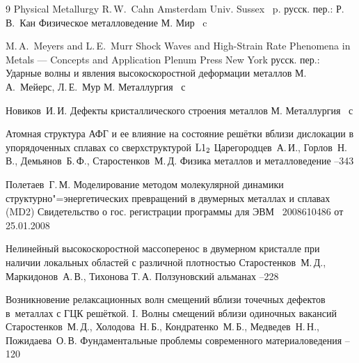 \begin{thebibliography}{9}
\book Physical Metallurgy 
\ed R.\,W.~Cahn
\publaddr Amsterdam
\publ Univ. Sussex
~p.
\rtransl
русск. пер.:
\ed Р.\,В.~Кан  
\book Физическое металловедение 
\publaddr  М.
\publ Мир
~c

\ed M.\,A.~Meyers and L.\,E.~Murr  
\book Shock Waves and High-Strain Rate Phenomena in Metals --- Concepts and Application
\publ Plenum Press
\publaddr New York
\rtransl
русск. пер.:
\book Ударные волны и явления высокоскоростной деформации металлов 
\ed М.\,А.~Мейерс, Л.\,Е.~Мур
\publaddr М.
\publ Металлургия
~с

\by Новиков~И.\,И. 
\book Дефекты кристаллического строения металлов 
\publaddr М.
\publ Металлургия
~с

\paper Атомная структура АФГ и ее влияние на состояние решётки вблизи дислокации в упорядоченных сплавах со сверхструктурой $\rm L1_{2}$
\by Царегородцев~А.\,И., Горлов~Н.\,В., Демьянов~Б.\,Ф., Старостенков~М.\,Д. 
\jour Физика металлов и металловедение
--343

\by Полетаев~Г.\,М.
\book Моделирование методом молекулярной динамики структурно"=энергетических превращений в двумерных металлах и сплавах (MD2)
\bookinfo Свидетельство о гос. регистрации программы для ЭВМ \No~2008610486 от 25.01.2008

\paper Нелинейный высокоскоростной массоперенос в двумерном кристалле при наличии локальных областей с различной плотностью 
\by Старостенков~М.\,Д., Маркидонов~А.\,В., Тихонова Т.\,А.
\jour Ползуновский альманах
--228

\paper Возникновение релаксационных волн смещений вблизи точечных дефектов в~металлах с ГЦК решёткой. I. Волны смещений вблизи одиночных вакансий
\by Старостенков~М.\,Д., Холодова~Н.\,Б., Кондратенко~М.\,Б., Медведев~Н.\,Н., Пожидаева~О.\,В.
\jour Фундаментальные проблемы современного материаловедения
--120


\end{thebibliography}

\makeengtitlem

%
%
%
%
%
%
%
%
%
%
%
%
%
%
%
%

